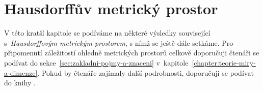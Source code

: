 \chapter{Hausdorffův metrický prostor}\label{chapter:hausdorffuv-mp}

V této kratší kapitole se podíváme na některé výsledky související s~\emph{Hausdorffovým metrickým prostorem}, s nímž se ještě dále setkáme. Pro připomenutí záležitostí ohledně metrických prostorů celkově doporučuji čtenáři se podívat do sekce~\ref{sec:zakladni-pojmy-a-znaceni} v~kapitole~\ref{chapter:teorie-miry-a-dimenze}. Pokud by čtenáře zajímaly další podrobnosti, doporučuji se podívat do knihy \citep[str. 71]{Edgar2008}.


